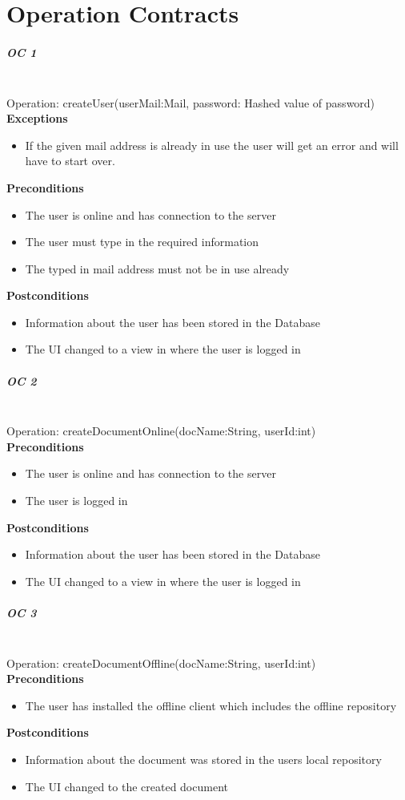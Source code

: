 \documentclass[a4paper,11pt,report]{report}
\begin{document}
\section{Operation Contracts}
\subparagraph{OC 1} \mbox{} \\
Operation: createUser(userMail:Mail, password: Hashed value of password) \\
\textbf{Exceptions}
\begin{itemize}
	\item If the given mail address is already in use the user will get an error and will have to start over.
	\end{itemize} 
\textbf{Preconditions}
\begin{itemize}
\item The user is online and has connection to the server
\item The user must type in the required information
\item The typed in mail address must not be in use already
\end{itemize} 
\textbf{Postconditions}
\begin{itemize}
\item Information about the user has been stored in the Database
\item The UI changed to a view in where the user is logged in
\end{itemize} 

\subparagraph{OC 2} \mbox{} \\
Operation: createDocumentOnline(docName:String, userId:int) \\
\textbf{Preconditions}
\begin{itemize}
\item The user is online and has connection to the server
\item The user is logged in
\end{itemize} 
\textbf{Postconditions}
\begin{itemize}
\item Information about the user has been stored in the Database
\item The UI changed to a view in where the user is logged in
\end{itemize} 

\subparagraph{OC 3} \mbox{} \\
Operation: createDocumentOffline(docName:String, userId:int) \\
\textbf{Preconditions}
\begin{itemize}
\item The user has installed the offline client which includes the offline repository
\end{itemize} 
\textbf{Postconditions}
\begin{itemize}
\item Information about the document was stored in the users local repository
\item The UI changed to the created document
\end{itemize} 
\end{document}
